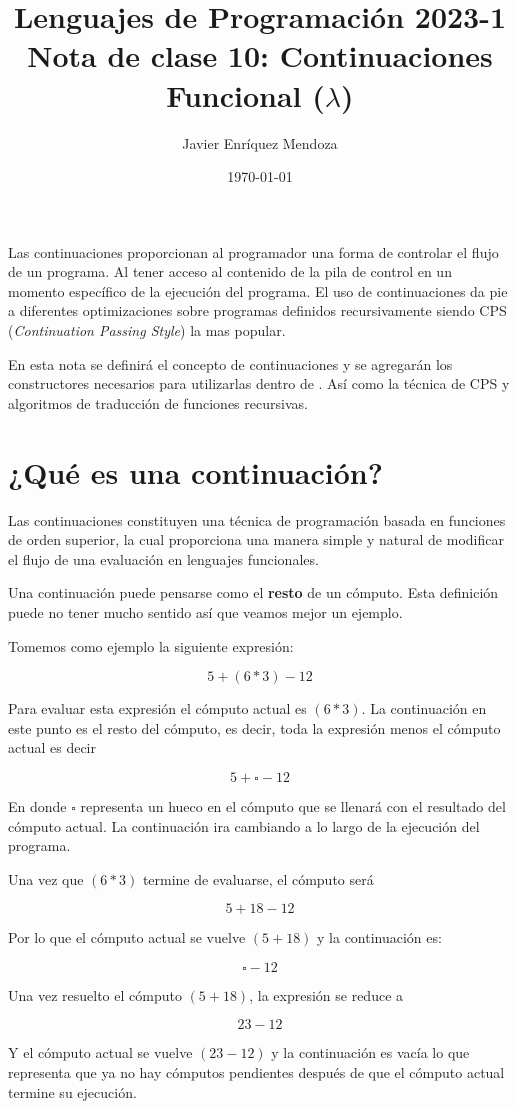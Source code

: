 \documentclass[12pt]{extarticle}
\title{\LARGE 
Lenguajes de Programación 2023-1\\ 
Nota de clase 10: Continuaciones \\
\color{SeaGreen} Funcional ($\lambda$)}
\author{Javier Enríquez Mendoza}
\date{\today}
\begin{document}
\maketitle

Las continuaciones proporcionan al programador una forma de controlar el flujo de un programa. Al tener acceso al contenido de la pila de control en un momento específico de la ejecución del programa. El uso de continuaciones da pie a diferentes optimizaciones sobre programas definidos recursivamente siendo CPS ({\it Continuation Passing Style}) la mas popular.

En esta nota se definirá el concepto de continuaciones y se agregarán los constructores necesarios para utilizarlas dentro de \minhs. Así como la técnica de CPS y algoritmos de traducción de funciones recursivas.

\section{¿Qué es una continuación?}
Las continuaciones constituyen una técnica de programación basada en funciones de orden superior, la cual proporciona una manera simple y natural de modificar el flujo de una evaluación en lenguajes funcionales.

Una continuación puede pensarse como el {\bf resto} de un cómputo. Esta definición puede no tener mucho sentido así que veamos mejor un ejemplo.

\begin{examples}[Continuación]
Tomemos como ejemplo la siguiente expresión:

$$5+(6*3)-12$$

Para evaluar esta expresión el cómputo actual es $(6*3)$. La continuación en este punto es el resto del cómputo, es decir, toda la expresión menos el cómputo actual es decir 

$$5+\square-12$$

En donde $\square$ representa un hueco en el cómputo que se llenará con el resultado del cómputo actual. La continuación ira cambiando a lo largo de la ejecución del programa.

Una vez que $(6*3)$ termine de evaluarse, el cómputo será 

$$5+18-12$$

Por lo que el cómputo actual se vuelve $(5+18)$ y la continuación es:

$$\square-12$$

Una vez resuelto el cómputo $(5+18)$, la expresión se reduce a

$$23-12$$

Y el cómputo actual se vuelve $(23-12)$ y la continuación es vacía lo que representa que ya no hay cómputos pendientes después de que el cómputo actual termine su ejecución.
\end{examples}
\end{document}
